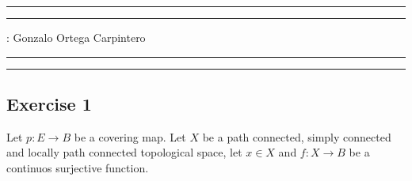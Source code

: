 \documentclass[11pt,a4paper]{article}
\begin{document}
\hrule\hrule
\vspace{1mm}


\vspace{1mm}

 : Gonzalo Ortega Carpintero
\vspace{2mm}

\hrule\hrule

\subsection*{Exercise 1}
Let $p\colon E \to B $ be a covering map. Let $ X $ be a path connected, simply connected and locally path connected topological space, let $ x \in X $ and $ f\colon X \to B $ be a continuos surjective function.
\end{document}
